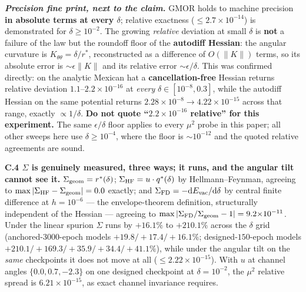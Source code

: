 \documentclass{article}
\begin{document}
\emph{\textbf{Precision fine print, next to the claim.}} GMOR holds to machine precision \textbf{in absolute terms at every $\delta$}; relative exactness ($\le2.7{\times}10^{-14}$) is demonstrated for $\delta\ge10^{-2}$. The growing \emph{relative} deviation at small $\delta$ is \textbf{not} a failure of the law but the roundoff floor of the \textbf{autodiff Hessian}: the angular curvature is $K_{\theta\theta}=\delta/r^*$, reconstructed as a difference of $O(\lVert K\rVert)$ terms, so its absolute error is $\sim\epsilon\lVert K\rVert$ and its relative error $\sim\epsilon/\delta$. This was confirmed directly: on the analytic Mexican hat a \textbf{cancellation-free} Hessian returns relative deviation $1.1$--$2.2{\times}10^{-16}$ at \emph{every} $\delta\in[10^{-8},0.3]$, while the autodiff Hessian on the same potential returns $2.28{\times}10^{-8}\to4.22{\times}10^{-15}$ across that range, exactly $\propto1/\delta$. \textbf{Do not quote ``$2.2{\times}10^{-16}$ relative'' for this experiment.} The same $\epsilon/\delta$ floor applies to every $\mu^2$ probe in this paper; all other sweeps here use $\delta\ge10^{-4}$, where the floor is $\sim10^{-12}$ and the quoted relative agreements are sound.

\textbf{C.4 $\Sigma$ is genuinely measured, three ways; it runs, and the angular tilt cannot see it.} $\Sigma_{\rm geom}=r^*(\delta)$; $\Sigma_{\rm HF}=u\cdot q^*(\delta)$ by Hellmann--Feynman, agreeing to $\max|\Sigma_{\rm HF}-\Sigma_{\rm geom}|=0.0$ exactly; and $\Sigma_{\rm FD}=-\mathrm{d}E_{\rm vac}/\mathrm{d}\delta$ by central finite difference at $h{=}10^{-6}$ --- the envelope-theorem definition, structurally independent of the Hessian --- agreeing to $\max|\Sigma_{\rm FD}/\Sigma_{\rm geom}-1|=9.2{\times}10^{-11}$. Under the linear spurion $\Sigma$ runs by $+16.1\%$ to $+210.1\%$ across the $\delta$ grid (anchored-$3000$-epoch models $+19.8/+17.4/+16.1\%$; designed-$150$-epoch models $+210.1/+169.3/+35.9/+34.4/+41.1\%$), while under the angular tilt on the \emph{same} checkpoints it does not move at all ($\le2.22{\times}10^{-15}$). With $u$ at channel angles $\{0.0,0.7,-2.3\}$ on one designed checkpoint at $\delta{=}10^{-2}$, the $\mu^2$ relative spread is $6.21{\times}10^{-15}$, as exact channel invariance requires.
\end{document}
